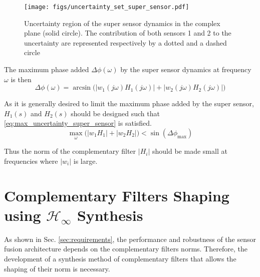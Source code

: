 \documentclass[letterpaper, 10 pt, conference]{ieeeconf}
\begin{document}
\begin{figure}[htbp]
\centering
\texttt{[image: figs/uncertainty\_set\_super\_sensor.pdf]}
\caption{\label{fig:uncertainty_set_super_sensor}
Uncertainty region of the super sensor dynamics in the complex plane (solid circle). The contribution of both sensors 1 and 2 to the uncertainty are represented respectively by a dotted and a dashed circle}
\end{figure}

The maximum phase added \(\Delta\phi(\omega)\) by the super sensor dynamics at frequency \(\omega\) is then
\begin{equation}
\label{eq:max_phase_uncertainty}
    \Delta\phi(\omega) = \arcsin\big( |w_1(j\omega) H_1(j\omega)| + |w_2(j\omega) H_2(j\omega)| \big)
\end{equation}

As it is generally desired to limit the maximum phase added by the super sensor, \(H_1(s)\) and \(H_2(s)\) should be designed such that \eqref{eq:max_uncertainty_super_sensor} is satisfied.
\begin{equation}
\label{eq:max_uncertainty_super_sensor}
   \max_\omega \big( \left|w_1 H_1\right| + \left|w_2 H_2\right|\big) < \sin\left( \Delta \phi_\text{max} \right)
\end{equation}

Thus the norm of the complementary filter \(|H_i|\) should be made small at frequencies where \(|w_i|\) is large.

\section{Complementary Filters Shaping using \(\mathcal{H}_\infty\) Synthesis}
\label{sec:org4512d61}
\label{sec:hinf_method}
As shown in Sec. \ref{sec:requirements}, the performance and robustness of the sensor fusion architecture depends on the complementary filters norms.
Therefore, the development of a synthesis method of complementary filters that allows the shaping of their norm is necessary.
\end{document}
